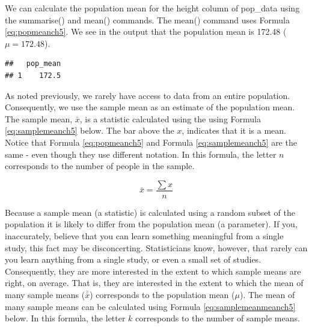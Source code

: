 \documentclass[
]{krantz}
\makeatletter
\newenvironment{Shaded}{\begin{snugshade}}{\end{snugshade}}
\newcommand{\DataTypeTok}[1]{\textcolor[rgb]{0.27,0.27,0.27}{#1}}
\newcommand{\KeywordTok}[1]{\textcolor[rgb]{0.27,0.27,0.27}{\textbf{#1}}}
\newcommand{\NormalTok}[1]{#1}
\newcommand{\OperatorTok}[1]{\textcolor[rgb]{0.43,0.43,0.43}{\textbf{#1}}}
\newcommand{\StringTok}[1]{\textcolor[rgb]{0.5,0.5,0.5}{#1}}
\newenvironment{kframe}{%
\medskip{}
\setlength{\fboxsep}{.8em}
 \def\at@end@of@kframe{}%
 \ifinner\ifhmode%
  \def\at@end@of@kframe{\end{minipage}}%
  \begin{minipage}{\columnwidth}%
 \fi\fi%
 \def\FrameCommand##1{\hskip\@totalleftmargin \hskip-\fboxsep
 \colorbox{shadecolor}{##1}\hskip-\fboxsep
     \hskip-\linewidth \hskip-\@totalleftmargin \hskip\columnwidth}%
 \MakeFramed {\advance\hsize-\width
   \@totalleftmargin\z@ \linewidth\hsize
   \@setminipage}}%
 {\par\unskip\endMakeFramed%
 \at@end@of@kframe}
\renewenvironment{Shaded}{\begin{kframe}}{\end{kframe}}
\makeatother
\begin{document}
We can calculate the population mean for the height column of pop\_data using the summarise() and mean() commands. The mean() command uses Formula \eqref{eq:popmeanch5}. We see in the output that the population mean is 172.48 (\(\mu = 172.48\)).

\begin{Shaded}
\end{Shaded}

\begin{verbatim}
##   pop_mean
## 1    172.5
\end{verbatim}

As noted previously, we rarely have access to data from an entire population. Consequently, we use the sample mean as an estimate of the population mean. The sample mean, \(\bar{x}\), is a statistic calculated using the using Formula \eqref{eq:samplemeanch5} below. The bar above the \(x\), indicates that it is a mean. Notice that Formula \eqref{eq:popmeanch5} and Formula \eqref{eq:samplemeanch5} are the same - even though they use different notation. In this formula, the letter \(n\) corresponds to the number of people in the sample.

\begin{equation} 
\bar{x} = \frac{\sum{x}}{n}
      \label{eq:samplemeanch5}
\end{equation}

Because a sample mean (a statistic) is calculated using a random subset of the population it is likely to differ from the population mean (a parameter). If you, inaccurately, believe that you can learn something meaningful from a single study, this fact may be disconcerting. Statisticians know, however, that rarely can you learn anything from a single study, or even a small set of studies. Consequently, they are more interested in the extent to which sample means are right, on average. That is, they are interested in the extent to which the mean of many sample means (\(\bar{\bar{x}}\)) corresponds to the population mean (\(\mu\)). The mean of many sample means can be calculated using Formula \eqref{eq:samplemeanmeanch5} below. In this formula, the letter \(k\) corresponds to the number of sample means.
\end{document}
